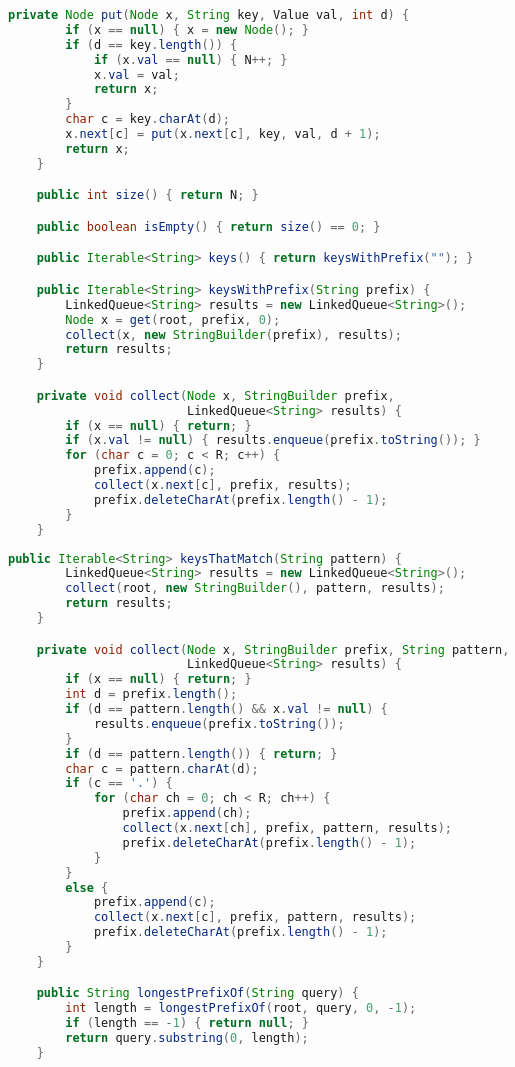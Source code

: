 \documentclass[8pt,a4paper,compress]{beamer}
\begin{document}
\begin{frame}[fragile]
\pause

\begin{lstlisting}[language=Java]
    private Node put(Node x, String key, Value val, int d) {
        if (x == null) { x = new Node(); }
        if (d == key.length()) {
            if (x.val == null) { N++; }
            x.val = val;
            return x;
        }
        char c = key.charAt(d);
        x.next[c] = put(x.next[c], key, val, d + 1);
        return x;
    }

    public int size() { return N; }

    public boolean isEmpty() { return size() == 0; }

    public Iterable<String> keys() { return keysWithPrefix(""); }

    public Iterable<String> keysWithPrefix(String prefix) {
        LinkedQueue<String> results = new LinkedQueue<String>();
        Node x = get(root, prefix, 0);
        collect(x, new StringBuilder(prefix), results);
        return results;
    }

    private void collect(Node x, StringBuilder prefix, 
                         LinkedQueue<String> results) {
        if (x == null) { return; }
        if (x.val != null) { results.enqueue(prefix.toString()); }
        for (char c = 0; c < R; c++) {
            prefix.append(c);
            collect(x.next[c], prefix, results);
            prefix.deleteCharAt(prefix.length() - 1);
        }
    }
\end{lstlisting}
\end{frame}

\begin{frame}[fragile]
\pause

\begin{lstlisting}[language=Java]
    public Iterable<String> keysThatMatch(String pattern) {
        LinkedQueue<String> results = new LinkedQueue<String>();
        collect(root, new StringBuilder(), pattern, results);
        return results;
    }

    private void collect(Node x, StringBuilder prefix, String pattern, 
                         LinkedQueue<String> results) {
        if (x == null) { return; }
        int d = prefix.length();
        if (d == pattern.length() && x.val != null) {
            results.enqueue(prefix.toString());
        }
        if (d == pattern.length()) { return; }
        char c = pattern.charAt(d);
        if (c == '.') {
            for (char ch = 0; ch < R; ch++) {
                prefix.append(ch);
                collect(x.next[ch], prefix, pattern, results);
                prefix.deleteCharAt(prefix.length() - 1);
            }
        }
        else {
            prefix.append(c);
            collect(x.next[c], prefix, pattern, results);
            prefix.deleteCharAt(prefix.length() - 1);
        }
    }

    public String longestPrefixOf(String query) {
        int length = longestPrefixOf(root, query, 0, -1);
        if (length == -1) { return null; }
        return query.substring(0, length); 
    }
\end{lstlisting}
\end{frame}
\end{document}
